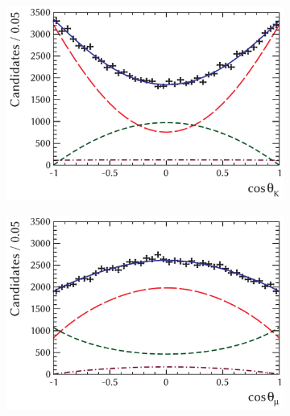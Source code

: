 \begin{figure}[tbp]
  \centering
  \begin{subfigure}{0.49\textwidth}
    \includegraphics[width=\textwidth]{graphics/results/ctk}
    \caption{}
  \end{subfigure}
  \hfill%
  \begin{subfigure}{0.49\textwidth}
    \includegraphics[width=\textwidth]{graphics/results/ctl}
    \caption{}
  \end{subfigure}


\end{figure}
